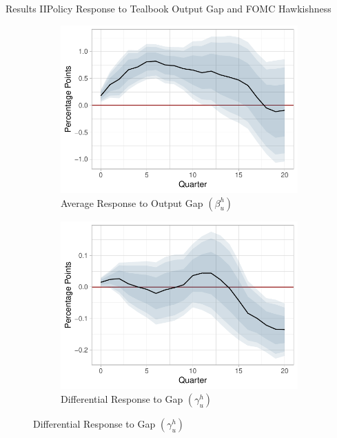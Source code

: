 \documentclass[11pt,pdf,aspectratio=129]{beamer}
\begin{document}
\begin{frame}{Results II}{Policy Response to Tealbook Output Gap and FOMC Hawkishness}

    \begin{figure}[!htbp]\centering
        \label{fig:LP}
        \begin{subfigure}[b]{0.49\textwidth}
            \centering
            \caption{Average Response to Output Gap $\left(\beta_u^h\right)$}
            \label{fig:average_unemployment}
            \includegraphics[width=\linewidth]{average_gap_shorter.pdf}
        \end{subfigure}
        \hfill
        \begin{subfigure}[b]{0.49\textwidth}
            \centering
            \caption{Differential Response to Gap $\left(\gamma_u^h\right)$}
            \label{fig:differential_unemployment}
            \includegraphics[width=\linewidth]{differential_gap_shorter.pdf}

\end{subfigure}
\end{figure}
\end{frame}
\end{document}
